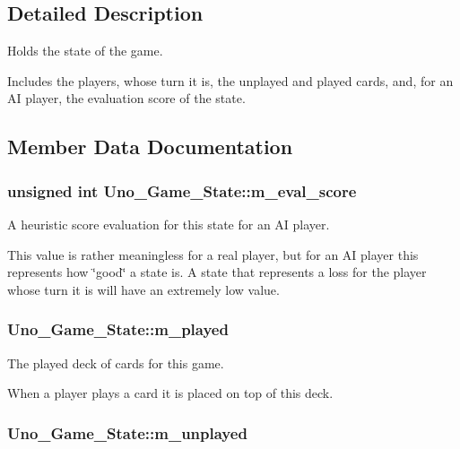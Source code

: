 \subsection{\-Detailed \-Description}
\-Holds the state of the game. 

\-Includes the players, whose turn it is, the unplayed and played cards, and, for an \-A\-I player, the evaluation score of the state. 

\subsection{\-Member \-Data \-Documentation}
\hypertarget{class_uno___game___state_ad55fa08fbfc6ddf4359194857dbd99fc}{
\subsubsection[{m\-\_\-eval\-\_\-score}]{\setlength{\rightskip}{0pt plus 5cm}unsigned int {\bf \-Uno\-\_\-\-Game\-\_\-\-State\-::m\-\_\-eval\-\_\-score}}}
\label{class_uno___game___state_ad55fa08fbfc6ddf4359194857dbd99fc}


\-A heuristic score evaluation for this state for an \-A\-I player. 

\-This value is rather meaningless for a real player, but for an \-A\-I player this represents how \char`\"{}good\char`\"{} a state is. \-A state that represents a loss for the player whose turn it is will have an extremely low value. \hypertarget{class_uno___game___state_ae274bd2383addaefbc78556c48757c35}{
\subsubsection[{m\-\_\-played}]{ {\bf \-Uno\-\_\-\-Game\-\_\-\-State\-::m\-\_\-played}}}
\label{class_uno___game___state_ae274bd2383addaefbc78556c48757c35}


\-The played deck of cards for this game. 

\-When a player plays a card it is placed on top of this deck. \hypertarget{class_uno___game___state_a7bf61c252c9de176f309b691b4038345}{
\subsubsection[{m\-\_\-unplayed}]{ {\bf \-Uno\-\_\-\-Game\-\_\-\-State\-::m\-\_\-unplayed}}}
\label{class_uno___game___state_a7bf61c252c9de176f309b691b4038345}


